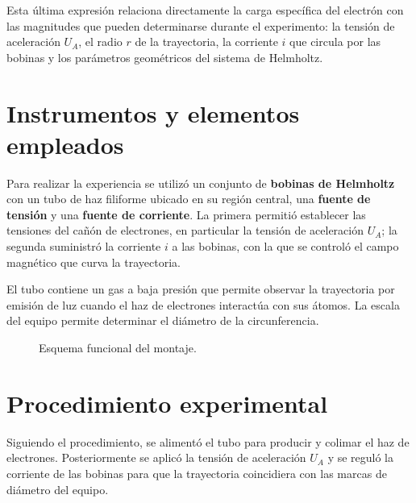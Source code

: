 \documentclass{article}
\begin{document}
Esta última expresión relaciona directamente la carga específica del electrón con las magnitudes que pueden determinarse durante el experimento: la tensión de aceleración \(U_A\), el radio \(r\) de la trayectoria, la corriente \(i\) que circula por las bobinas y los parámetros geométricos del sistema de Helmholtz.

\vspace*{25pt}

\section{Instrumentos y elementos empleados}
Para realizar la experiencia se utilizó un conjunto de \textbf{bobinas de Helmholtz} con un tubo de haz filiforme ubicado en su región central, una \textbf{fuente de tensión} y una \textbf{fuente de corriente}. La primera permitió establecer las tensiones del cañón de electrones, en particular la tensión de aceleración $U_A$; la segunda suministró la corriente $i$ a las bobinas, con la que se controló el campo magnético que curva la trayectoria.

El tubo contiene un gas a baja presión que permite observar la trayectoria por emisión de luz cuando el haz de electrones interactúa con sus átomos. La escala del equipo permite determinar el diámetro de la circunferencia.

\begin{figure}[H]
\centering
{}
\caption{Esquema funcional del montaje.}
\end{figure}

\section{Procedimiento experimental}
Siguiendo el procedimiento, se alimentó el tubo para producir y colimar el haz de electrones. Posteriormente se aplicó la tensión de aceleración $U_A$ y se reguló la corriente de las bobinas para que la trayectoria coincidiera con las marcas de diámetro del equipo.
\end{document}
